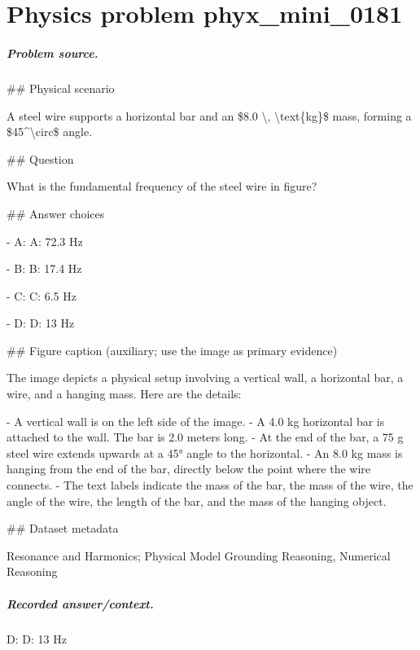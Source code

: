 
\chapter{Physics problem phyx\_mini\_0181}
\label{ch:PhyXMiniProblems_problem_phyx_mini_0181}

\paragraph{Problem source.}
\#\# Physical scenario

A steel wire supports a horizontal bar and an \$8.0 \textbackslash{}, \textbackslash{}text\{kg\}\$ mass, forming a \$45\textasciicircum{}\textbackslash{}circ\$ angle.

\#\# Question

What is the fundamental frequency of the steel wire in figure?

\#\# Answer choices

- A: A: 72.3 Hz

- B: B: 17.4 Hz

- C: C: 6.5 Hz

- D: D: 13 Hz

\#\# Figure caption (auxiliary; use the image as primary evidence)

The image depicts a physical setup involving a vertical wall, a horizontal bar, a wire, and a hanging mass. Here are the details:

- A vertical wall is on the left side of the image.
- A 4.0 kg horizontal bar is attached to the wall. The bar is 2.0 meters long.
- At the end of the bar, a 75 g steel wire extends upwards at a 45° angle to the horizontal.
- An 8.0 kg mass is hanging from the end of the bar, directly below the point where the wire connects.
- The text labels indicate the mass of the bar, the mass of the wire, the angle of the wire, the length of the bar, and the mass of the hanging object.

\#\# Dataset metadata

Resonance and Harmonics; Physical Model Grounding Reasoning, Numerical Reasoning

\paragraph{Recorded answer/context.}
D: D: 13 Hz

